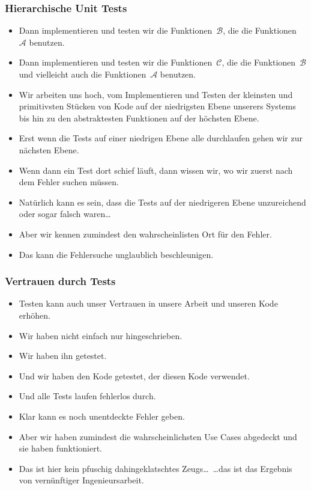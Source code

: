 \documentclass[aspectratio=169,mathserif,notheorems]{beamer}%
\begin{document}
\begin{frame}[t]%
\frametitle{Hierarchische Unit Tests}%
\begin{itemize}%
%
%
%
%
\item<4-> Dann implementieren und testen wir die Funktionen~$\mathcal{B}$, die die Funktionen~$\mathcal{A}$ benutzen.%
%
\item<5-> Dann implementieren und testen wir die Funktionen~$\mathcal{C}$, die die Funktionen~$\mathcal{B}$ und vielleicht auch die Funktionen~$\mathcal{A}$ benutzen.%
%
\item<6-> Wir arbeiten uns hoch, vom Implementieren und Testen der kleinsten und primitivsten Stücken von Kode auf der niedrigsten Ebene unserers Systems bis hin zu den abstraktesten Funktionen auf der höchsten Ebene.%
%
\item<7-> Erst wenn die Tests auf einer niedrigen Ebene alle durchlaufen gehen wir zur nächsten Ebene.%
%
\item<8-> Wenn dann ein Test dort schief läuft, dann wissen wir, wo wir zuerst nach dem Fehler suchen müssen.%
%
\item<9-> Natürlich kann es sein, dass die Tests auf der niedrigeren Ebene unzureichend oder sogar falsch waren\dots%
%
\item<10-> Aber wir kennen zumindest den wahrscheinlisten Ort für den Fehler.%
%
\item<11-> Das kann die Fehlersuche unglaublich beschleunigen.%
\end{itemize}%
\end{frame}%
%
\begin{frame}%
\frametitle{Vertrauen durch Tests}%
\begin{itemize}%
\item Testen kann auch unser Vertrauen in unsere Arbeit und unseren Kode erhöhen.%
%
\item<2-> Wir haben  nicht einfach nur hingeschrieben.%
%
\item<3-> Wir haben ihn getestet.%
%
\item<4-> Und wir haben den Kode getestet, der diesen Kode verwendet.%
%
\item<5-> Und alle Tests laufen fehlerlos durch.%
%
\item<6-> Klar kann es noch unentdeckte Fehler geben.%
%
\item<7-> Aber wir haben zumindest die wahrscheinlichsten Use Cases abgedeckt und sie haben funktioniert.%
%
\item<8-> Das ist hier kein pfuschig dahingeklatschtes Zeugs\dots\ {\dots}das ist das Ergebnis von vernünftiger Ingenieursarbeit.%
\end{itemize}%
\end{frame}%
\end{document}
